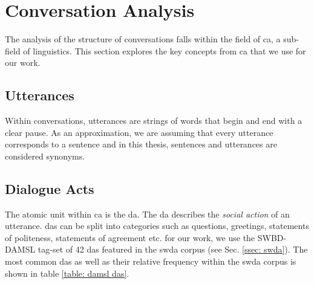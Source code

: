 \section{Conversation Analysis \label{sec: ca}}
The analysis of the structure of conversations falls within the field of \gls{ca}, a sub-field of linguistics. This section explores the key concepts from \gls{ca} that we use for our work. 
    \subsection{Utterances \label{ssec: utterances}}
        Within conversations, \glspl{utterance} are strings of words that begin and end with a clear pause. As an approximation, we are assuming that every \gls{utterance} corresponds to a sentence and in this thesis, sentences and \glspl{utterance} are considered synonyms.
        
        
    \subsection{Dialogue Acts \label{ssec: DAs}}
        The atomic unit within \gls{ca} is the \gls{da}. The \gls{da} describes the \textit{social action} of an \gls{utterance}. \Glspl{da} can be split into categories such as questions, greetings, statements of politeness, statements of agreement etc. for our work, we use the SWBD-DAMSL tag-set of 42 \glspl{da} featured in the \gls{swda} corpus (see Sec. \ref{ssec: swda})\cite{fang2012annotation, swda}. The most common \glspl{da} as well as their relative frequency within the \gls{swda} corpus is shown in table \ref{table: damsl das}.
        
